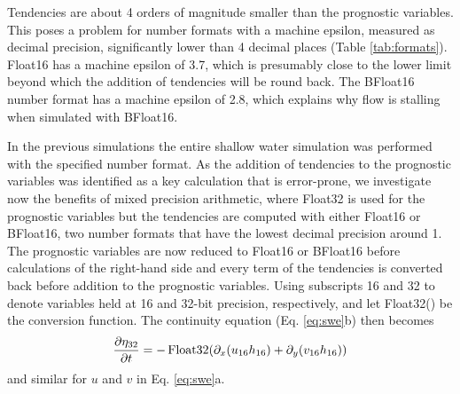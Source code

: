 Tendencies are about 4 orders of magnitude smaller than the prognostic variables.
This poses a problem for number formats with a machine epsilon, measured as decimal
precision, significantly lower than 4 decimal places (Table \ref{tab:formats}).
Float16 has a machine epsilon of 3.7, which is presumably close to the lower limit
beyond which the addition of tendencies will be round back. The BFloat16 number
format has a machine epsilon of 2.8, which explains why flow is stalling when
simulated with BFloat16.

In the previous simulations the entire shallow water simulation was performed
with the specified number format. As the addition of tendencies to the prognostic
variables was identified as a key calculation that is error-prone, we investigate
now the benefits of mixed precision arithmetic, where Float32 is used for the
prognostic variables but the tendencies are computed with either Float16 or
BFloat16, two number formats that have the lowest decimal precision around 1.
The prognostic variables are now reduced to Float16 or BFloat16 before calculations
of the right-hand side and every term of the tendencies is converted back before
addition to the prognostic variables. Using subscripts 16 and 32 to denote variables
held at 16 and 32-bit precision, respectively, and let Float32() be the conversion
function. The continuity equation (Eq. \ref{eq:swe}b) then becomes
\begin{equation}
\frac{\partial \eta_{32}}{\partial t} = -\operatorname{Float32}( \partial_x(u_{16}h_{16})
+ \partial_y(v_{16}h_{16} ))
\label{eq:conversion}
\end{equation}
and similar for $u$ and $v$ in Eq. \ref{eq:swe}a.

